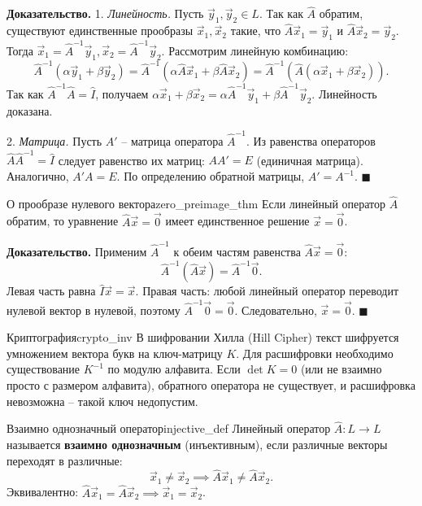\documentclass[12pt,a4paper]{article}
\newenvironment{myproof}{\noindent\textbf{Доказательство.}}{\hfill$\blacksquare$}
\begin{document}
\begin{myproof}
  1. \textit{Линейность.} Пусть $\vec{y}_1, \vec{y}_2 \in L$. Так как
  $\hat{A}$ обратим, существуют единственные прообразы $\vec{x}_1,
  \vec{x}_2$ такие, что $\hat{A}\vec{x}_1 = \vec{y}_1$ и
  $\hat{A}\vec{x}_2 = \vec{y}_2$. Тогда $\vec{x}_1 =
  \hat{A}^{-1}\vec{y}_1, \vec{x}_2 = \hat{A}^{-1}\vec{y}_2$.
  Рассмотрим линейную комбинацию:
  \[
    \hat{A}^{-1}(\alpha\vec{y}_1 + \beta\vec{y}_2) =
    \hat{A}^{-1}(\alpha\hat{A}\vec{x}_1 + \beta\hat{A}\vec{x}_2) =
    \hat{A}^{-1}(\hat{A}(\alpha\vec{x}_1 + \beta\vec{x}_2)).
  \]
  Так как $\hat{A}^{-1}\hat{A} = \hat{I}$, получаем $\alpha\vec{x}_1
  + \beta\vec{x}_2 = \alpha\hat{A}^{-1}\vec{y}_1 +
  \beta\hat{A}^{-1}\vec{y}_2$. Линейность доказана.

  2. \textit{Матрица.} Пусть $A'$ -- матрица оператора
  $\hat{A}^{-1}$. Из равенства операторов $\hat{A}\hat{A}^{-1} =
  \hat{I}$ следует равенство их матриц: $A A' = E$ (единичная
  матрица). Аналогично, $A' A = E$. По определению обратной матрицы,
  $A' = A^{-1}$.
\end{myproof}

\begin{theorem}{О прообразе нулевого вектора}{zero_preimage_thm}
  Если линейный оператор $\hat{A}$ обратим, то уравнение
  $\hat{A}\vec{x} = \vec{0}$ имеет единственное решение $\vec{x} = \vec{0}$.
\end{theorem}

\begin{myproof}
  Применим $\hat{A}^{-1}$ к обеим частям равенства $\hat{A}\vec{x} = \vec{0}$:
  \[
    \hat{A}^{-1}(\hat{A}\vec{x}) = \hat{A}^{-1}\vec{0}.
  \]
  Левая часть равна $\hat{I}\vec{x} = \vec{x}$. Правая часть: любой
  линейный оператор переводит нулевой вектор в нулевой, поэтому
  $\hat{A}^{-1}\vec{0} = \vec{0}$. Следовательно, $\vec{x} = \vec{0}$.
\end{myproof}

\begin{remarkIT}{Криптография}{crypto_inv}
  В шифровании Хилла (Hill Cipher) текст шифруется умножением вектора
  букв на ключ-матрицу $K$. Для расшифровки необходимо существование
  $K^{-1}$ по модулю алфавита. Если $\det K = 0$ (или не взаимно
  просто с размером алфавита), обратного оператора не существует, и
  расшифровка невозможна -- такой ключ недопустим.
\end{remarkIT}

\begin{definition}{Взаимно однозначный оператор}{injective_def}
  Линейный оператор $\hat{A}: L \to L$ называется \textbf{взаимно
  однозначным} (инъективным), если различные векторы переходят в различные:
  \[
    \vec{x}_1 \neq \vec{x}_2 \implies \hat{A}\vec{x}_1 \neq \hat{A}\vec{x}_2.
  \]
  Эквивалентно: $\hat{A}\vec{x}_1 = \hat{A}\vec{x}_2 \implies
  \vec{x}_1 = \vec{x}_2$.
\end{definition}
\end{document}
